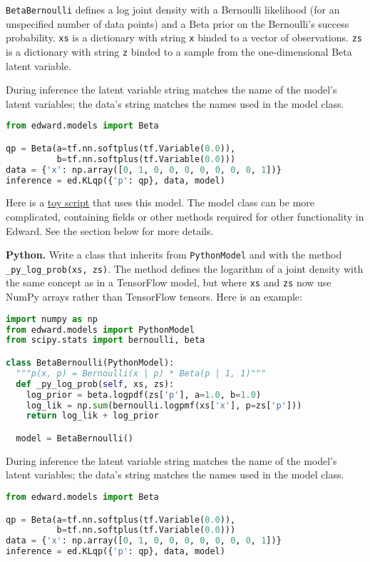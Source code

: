 \texttt{BetaBernoulli} defines a log joint density with a Bernoulli
likelihood (for an unspecified number of data points) and a Beta prior
on the Bernoulli's success probability.
\texttt{xs} is a dictionary with string \texttt{x} binded to a vector of
observations. \texttt{zs} is a dictionary with string \texttt{z} binded to a
sample from the one-dimensional Beta latent variable.

During inference the latent variable string matches the name of the
model's latent variables; the data's string matches the names used in
the model class.

\begin{lstlisting}[language=Python]
from edward.models import Beta

qp = Beta(a=tf.nn.softplus(tf.Variable(0.0)),
          b=tf.nn.softplus(tf.Variable(0.0)))
data = {'x': np.array([0, 1, 0, 0, 0, 0, 0, 0, 0, 1])}
inference = ed.KLqp({'p': qp}, data, model)
\end{lstlisting}

Here is a
\href{https://github.com/blei-lab/edward/blob/master/examples/tf_beta_bernoulli.py}
{toy script}
that uses this model. The model class can be more complicated,
containing fields or other methods required for other functionality in
Edward. See the section below for more details.

\textbf{Python.}
Write a class that inherits from \texttt{PythonModel} and with the method
\texttt{_py_log_prob(xs, zs)}. The method defines the logarithm of a joint
density with the same concept as in a TensorFlow model, but where
\texttt{xs} and \texttt{zs} now use NumPy arrays rather than TensorFlow tensors.
Here is an example:

\begin{lstlisting}[language=Python]
import numpy as np
from edward.models import PythonModel
from scipy.stats import bernoulli, beta

class BetaBernoulli(PythonModel):
  """p(x, p) = Bernoulli(x | p) * Beta(p | 1, 1)"""
  def _py_log_prob(self, xs, zs):
    log_prior = beta.logpdf(zs['p'], a=1.0, b=1.0)
    log_lik = np.sum(bernoulli.logpmf(xs['x'], p=zs['p']))
    return log_lik + log_prior

  model = BetaBernoulli()
\end{lstlisting}

During inference the latent variable string matches the name of the
model's latent variables; the data's string matches the names used in
the model class.

\begin{lstlisting}[language=Python]
from edward.models import Beta

qp = Beta(a=tf.nn.softplus(tf.Variable(0.0)),
          b=tf.nn.softplus(tf.Variable(0.0)))
data = {'x': np.array([0, 1, 0, 0, 0, 0, 0, 0, 0, 1])}
inference = ed.KLqp({'p': qp}, data, model)
\end{lstlisting}

